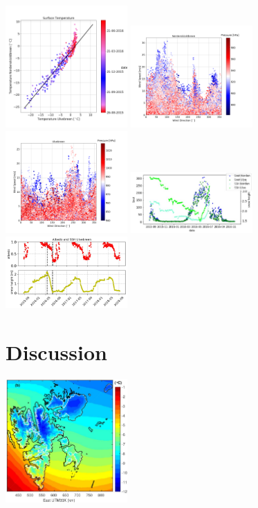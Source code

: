 \documentclass[11pt]{report}
\begin{document}
\includegraphics[scale=1, width=0.35\textwidth]{TsurfU-N.png}
\includegraphics[scale=1, width=0.35\textwidth]{WD-WS-PR-Nordenskioldbreen.png}
\includegraphics[scale=1, width=0.35\textwidth]{WD-WS-PR-Ulvebreen.png}
\includegraphics[scale=1, width=0.35\textwidth]{Picture1.jpg}
\includegraphics[scale=1, width=0.35\textwidth]{Picture2.jpg}


\chapter{Discussion}\label{sec:discussion}
\includegraphics[scale=1, width=0.35\textwidth]{ostby.jpg}
\end{document}

